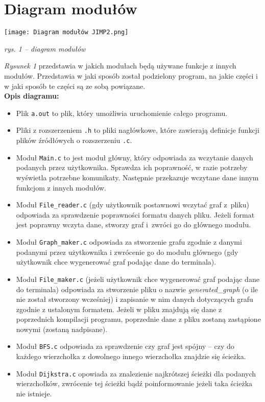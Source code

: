 \documentclass[12pt, a4paper]{article}
\begin{document}
\section{Diagram modułów}

\begin{center}
\texttt{[image: Diagram modułów JIMP2.png]}
\caption{\textit{rys. 1 -- diagram modułów} \label{overflow}}
\end{center}

\textit{Rysunek 1} przedstawia w jakich modułach będą używane funkcje z innych modułów. Przedstawia w jaki sposób został podzielony program, na jakie części i w jaki sposób te części są ze sobą powiązane.\\

\textbf{Opis diagramu:}

\begin{itemize}
    \item Plik \texttt{a.out} to plik, który umożliwia uruchomienie całego programu.
    \item Pliki z rozszerzeniem \texttt{.h} to pliki nagłówkowe, które zawierają definicje funkcji plików źródłówych o rozszerzeniu \texttt{.c}. \newpage
    \item Moduł \texttt{Main.c} to jest moduł główny, który odpowiada za wczytanie danych podanych przez użytkownika. Sprawdza ich poprawność, w razie potrzeby wyświetla potrzebne komunikaty. Następnie przekazuje wczytane dane innym funkcjom z innych modułów.
    \item Moduł \texttt{File\_reader.c} (gdy użytkownik postawnowi wczytać graf z~pliku) odpowiada za sprawdzenie poprawności formatu danych pliku. Jeżeli format jest poprawny wczyta dane, stworzy graf i~zwróci go do głównego modułu.
    \item Moduł \texttt{Graph\_maker.c} odpowiada za stworzenie grafu zgodnie z danymi podanymi przez użytkownika i zwrócenie go do modułu głównego (gdy użytkownik chce wygenerować graf podając dane do terminala).
    \item Moduł \texttt{File\_maker.c} (jeżeli użytkownik chce wygenerować graf podając dane do terminala) odpowiada za stworzenie pliku o nazwie \textit{generated\_graph} (o ile nie został stworzony wcześniej) i zapisanie w nim danych dotyczących grafu zgodnie z ustalonym formatem. Jeżeli w pliku znajdują się dane z poprzednich kompilacji programu, poprzednie dane z pliku zostaną zastąpione nowymi (zostaną nadpisane).
    \item Moduł \texttt{BFS.c} odpowiada za sprawdzenie czy graf jest spójny -- czy do każdego wierzchołka z dowolnego innego wierzchołka znajdzie się ścieżka.
    \item Moduł \texttt{Dijkstra.c} opowiada za znalezienie najkrótszej ścieżki dla podanych wierzchołków, zwrócenie tej ścieżki bądź poinformowanie jeżeli taka ścieżka nie istnieje.
\end{itemize}
\end{document}
